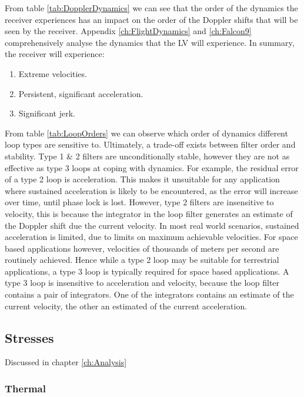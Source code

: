     From table \ref{tab:DopplerDynamics} we can see that the order of the dynamics the receiver experiences has an impact on the order of the Doppler shifts that will be seen by the receiver. Appendix \ref{ch:FlightDynamics} and \ref{ch:Falcon9} comprehensively analyse the dynamics that the \ac{LV} will experience. In summary, the receiver will experience:
    
    \begin{enumerate}
    \item{Extreme velocities.}
    \item{Persistent, significant acceleration.}
    \item{Significant jerk.}
    \end{enumerate}
    
    From table \ref{tab:LoopOrders} we can observe which order of dynamics different loop types are sensitive to. Ultimately, a trade-off exists between filter order and stability. Type 1 \& 2 filters are unconditionally stable, however they are not as effective as type 3 loops at coping with dynamics. For example, the residual error of a type 2 loop is acceleration. This makes it unsuitable for any application where sustained acceleration is likely to be encountered, as the error will increase over time, until phase lock is lost. However, type 2 filters are insensitive to velocity, this is because the integrator in the loop filter generates an estimate of the Doppler shift due the current velocity. In most real world scenarios, sustained acceleration is limited, due to limits on maximum achievable velocities. For space based applications however, velocities of thousands of meters per second are routinely achieved. Hence while a type 2 loop may be suitable for terrestrial applications, a type 3 loop is typically required for space based applications. A type 3 loop is insensitive to acceleration and velocity, because the loop filter contains a pair of integrators. One of the integrators contains an estimate of the current velocity, the other an estimated of the current acceleration\cite{Kaplan}. 
    
    
    
	\subsection{Stresses}
	    
	    Discussed in chapter \ref{ch:Analysis}
	    
		\subsubsection{Thermal}
